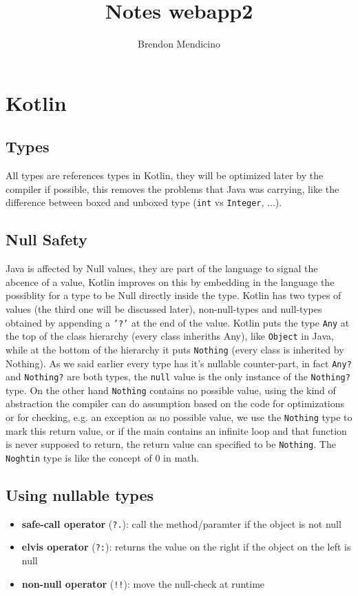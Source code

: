 \documentclass[12pt]{article}
\title{Notes webapp2}
\author{Brendon Mendicino}
\begin{document}
\maketitle
\newpage
\tableofcontents
\newpage


\section{Kotlin}
\subsection{Types}
All types are references types in Kotlin, they will be optimized later by the compiler if possible, this removes the problems that Java was carrying, like the difference between boxed and unboxed type (\texttt{int} vs \texttt{Integer}, ...).

\subsection{Null Safety}
Java is affected by Null values, they are part of the language to signal the abcence of a value, Kotlin improves on this by embedding in the language the possiblity for a type to be Null directly inside the type. Kotlin has two types of values (the third one will be discussed later), non-null-types and null-types obtained by appending a \texttt{'?'} at the end of the value. Kotlin puts the type \texttt{Any} at the top of the class hierarchy (every class inheriths Any), like \texttt{Object} in Java, while at the bottom of the hierarchy it puts \texttt{Nothing} (every class is inherited by Nothing). As we said earlier every type has it's nullable counter-part, in fact \texttt{Any?} and \texttt{Nothing?} are both types, the \texttt{null} value is the only instance of the \texttt{Nothing?} type. On the other hand \texttt{Nothing} contains no possible value, using the kind of abstraction the compiler can do assumption based on the code for optimizations or for checking, e.g. an exception as no possible value, we use the \texttt{Nothing} type to mark this return value, or if the main contains an infinite loop and that function is never supposed to return, the return value can specified to be \texttt{Nothing}. The \texttt{Noghtin} type is like the concept of 0 in math.

\subsection{Using nullable types}
\begin{itemize}
  \item \textbf{safe-call operator} (\texttt{?.}): call the method/paramter if the object is not null
  \item \textbf{elvis operator} (\texttt{?:}): returns the value on the right if the object on the left is null
  \item \textbf{non-null operator} (\texttt{!!}): move the null-check at runtime
\end{itemize}
\end{document}

